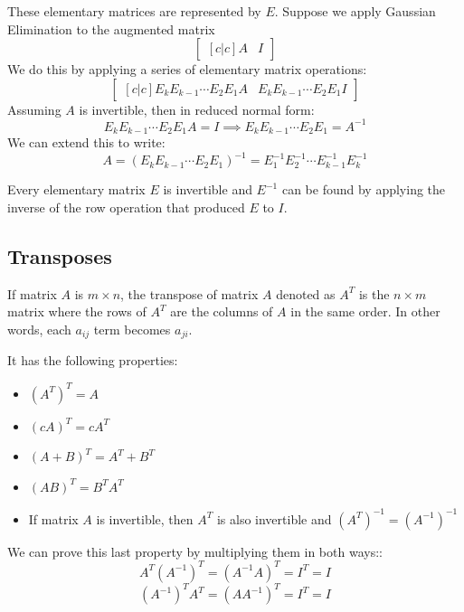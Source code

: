\documentclass{article}
\begin{document}
These elementary matrices are represented by $E$. Suppose we apply Gaussian Elimination to the augmented matrix
\begin{equation}
    \begin{bmatrix}[c|c]
        A&I
    \end{bmatrix}
    \label{eq:}
\end{equation}
We do this by applying a series of elementary matrix operations:
\begin{equation}
\begin{bmatrix}[c|c]
    E_{k}E_{k-1}\cdots E_2E_1A &     E_{k}E_{k-1}\cdots E_2E_1I
\end{bmatrix}
\end{equation}
Assuming $A$ is invertible, then in reduced normal form:
\begin{equation}
    E_{k}E_{k-1}\cdots E_2E_1A  = I \implies E_{k}E_{k-1}\cdots E_2E_1 = A^{-1}
    \label{eq:}
\end{equation}
We can extend this to write:
\begin{equation}
    A = \left(E_{k}E_{k-1}\cdots E_2E_1\right)^{-1}=E_1^{-1}E_2^{-1}\cdots E_{k-1}^{-1}E_k^{-1}
    \label{eq:}
\end{equation}
\begin{theorem}
    Every elementary matrix $E$ is invertible and $E^{-1}$ can be found by applying the inverse of the row operation that produced $E$ to $I$.
\end{theorem}
\subsection{Transposes}
\begin{definition}
    If matrix $A$ is $m\times n$, the transpose of matrix $A$ denoted as $A^T$ is the $n\times m$ matrix where the rows of $A^T$ are the columns of $A$ in the same order. In other words, each $a_{ij}$ term becomes $a_{ji}$. 
\end{definition}
It has the following properties:
\begin{itemize}
    \item $\left(A^T\right)^T=A$
    \item $(cA)^T=cA^T$
    \item $(A+B)^T=A^T+B^T$
    \item $(AB)^T=B^TA^T$
    \item If matrix $A$ is invertible, then $A^T$ is also invertible and $\left(A^T\right)^{-1}=\left(A^{-1}\right)^{-1}$
\end{itemize}
We can prove this last property by multiplying them in both ways::
\begin{equation}
    A^T\left(A^{-1}\right)^T = \left(A^{-1}A\right)^T = I^T = I
    \label{eq:}
\end{equation}
\begin{equation}
    \left(A^{-1}\right)^TA^T = \left(AA^{-1}\right)^T = I^T = I
    \label{eq:}
\end{equation}
\end{document}
